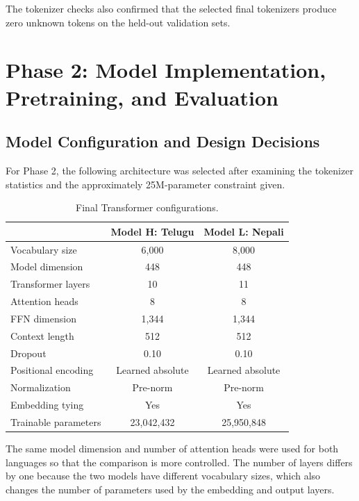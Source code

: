 \documentclass[10pt,a4paper]{article}
\begin{document}
The tokenizer checks also confirmed that the selected final
tokenizers produce zero unknown tokens on the held-out validation
sets.

\section{Phase 2: Model Implementation, Pretraining, and Evaluation}

\subsection{Model Configuration and Design Decisions}

For Phase 2, the following architecture was selected after examining
the tokenizer statistics and the approximately 25M-parameter
constraint given.

\begin{table}[H]
\centering
\small
\caption{Final Transformer configurations.}
\begin{tabular}{lcc}
\toprule
 & \textbf{Model H: Telugu} & \textbf{Model L: Nepali}\\
\midrule
Vocabulary size & 6,000 & 8,000\\
Model dimension & 448 & 448\\
Transformer layers & 10 & 11\\
Attention heads & 8 & 8\\
FFN dimension & 1,344 & 1,344\\
Context length & 512 & 512\\
Dropout & 0.10 & 0.10\\
Positional encoding & Learned absolute & Learned absolute\\
Normalization & Pre-norm & Pre-norm\\
Embedding tying & Yes & Yes\\
Trainable parameters & 23,042,432 & 25,950,848\\
\bottomrule
\end{tabular}
\end{table}

The same model dimension and number of attention heads were used for
both languages so that the comparison is more controlled. The number
of layers differs by one because the two models have different
vocabulary sizes, which also changes the number of parameters used by
the embedding and output layers.
\end{document}
